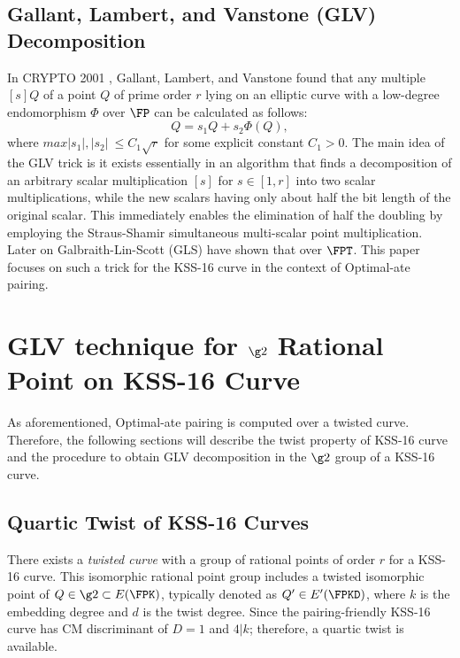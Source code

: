 \subsection{Gallant, Lambert, and Vanstone (GLV) Decomposition}
In CRYPTO 2001 \cite{gallant2001faster}, Gallant, Lambert, and Vanstone found that any multiple $[s]Q$ of a point $Q$ of prime order $r$ lying on an elliptic curve with a low-degree endomorphism $\Phi$ over $\FP$ can be calculated as follows:
\begin{equation}
    [s]Q = s_1 Q + s_2 \Phi(Q),  
\end{equation}
where $max{|s_1|,|s_2|}  ~\leq C_1 \sqrt{r}$ for some explicit constant $C_1 > 0$.
The main idea of the GLV trick is it exists essentially in an algorithm that finds a decomposition of an arbitrary scalar multiplication $[s]$ for $s \in  [1,r]$ into two scalar multiplications, while the new scalars having only about half the bit length of the original scalar.
This immediately enables the elimination of half the doubling by employing the Straus-Shamir simultaneous multi-scalar point multiplication. 
Later on Galbraith-Lin-Scott (GLS) have shown that over $\FPT$. 
This paper focuses on such a trick for the KSS-16 curve in the context of Optimal-ate pairing. 

\section{GLV technique for $\g2$ Rational Point on  KSS-16 Curve} \label{Proposal}
As aforementioned, Optimal-ate pairing is computed over a twisted curve. 
Therefore, the following sections will describe the twist property of KSS-16 curve and the procedure to obtain GLV decomposition in the $\g2$ group of a KSS-16 curve.

\subsection{Quartic Twist of KSS-16 Curves} \label{Quartic_twist}
There exists a \textit{twisted curve} with a group of rational points of order $r$ for a KSS-16 curve. 
This isomorphic rational point group includes a twisted isomorphic point of $Q \in \g2 \subset E(\FPK)$, typically denoted as $Q' \in E'(\FPKD)$, where $k$ is the embedding degree and $d$ is the twist degree.  
Since the pairing-friendly KSS-16 \cite{kss} curve has CM discriminant of $D = 1$ and $4|k$; therefore, a quartic twist is available.

